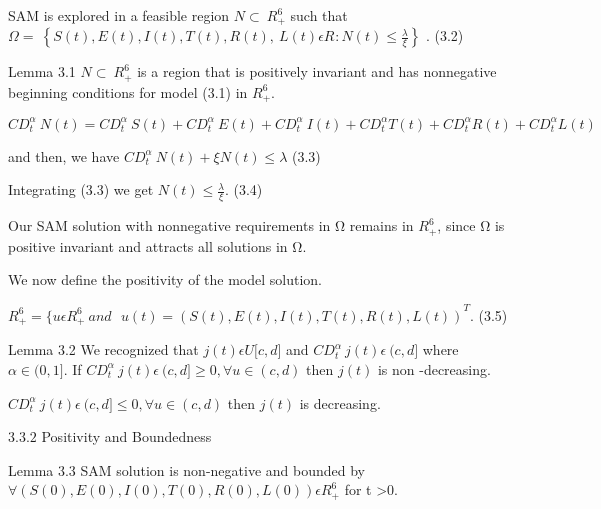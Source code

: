\documentclass[10pt]{NSP1}
\begin{document}
\par\vspace{14.0pt}\vspace{14.0pt}

SAM is explored in a feasible region \(N \subset \ R_{+}^{6}\) such that \(\Omega = \ \left\{ S(t),E(t),I(t),T(t),R(t),\ L(t)\epsilon R^{}:N(t) \leq \frac{\lambda}{\xi} \right\}\) . (3.2)

Lemma 3.1 \(N \subset \ R_{+}^{6}\) is a region that is positively invariant and has nonnegative beginning conditions for model (3.1) in \(R_{+}^{6}.\)

\par\vspace{14.0pt}\vspace{14.0pt}

\[
CD_{t}^{\alpha}\ N(t) = CD_{t}^{\alpha}\ S(t) + CD_{t}^{\alpha}\ E(t) + CD_{t}^{\alpha}\ I(t) + CD_{t}^{\alpha}T(t) + CD_{t}^{\alpha}R(t) + CD_{t}^{\alpha}L(t)
\]

and then, we have \(CD_{t}^{\alpha}\ N(t) + \xi N(t) \leq \lambda\) (3.3)

Integrating (3.3) we get \(N(t) \leq \frac{\lambda}{\xi}\). (3.4)

Our SAM solution with nonnegative requirements in Ω remains in \(R_{+}^{6}\), since Ω is positive invariant and attracts all solutions in Ω.

We now define the positivity of the model solution.

\(R_{+}^{6} = {\{ u\epsilon R_{+}^{6}\ and\ \ \ u(t) = (S(t),E(t),I(t),T(t),R(t),L(t))}^{T}.\) (3.5)

Lemma 3.2 We recognized that \(j(t)\epsilon U\lbrack c,d\rbrack\) and \(CD_{t}^{\alpha}\ j(t)\epsilon\ (c,d\rbrack\) where \(\alpha \in (0,1\rbrack\). If \(CD_{t}^{\alpha}\ j(t)\epsilon\ (c,d\rbrack \geq 0,\forall u \in (c,d)\) then \(j(t)\) is non -decreasing.

\(CD_{t}^{\alpha}\ j(t)\epsilon\ (c,d\rbrack \leq 0,\forall u \in (c,d)\) then \(j(t)\) is decreasing.

3\(.3.2\) Positivity and Boundedness

Lemma 3.3 SAM solution is non-negative and bounded by \(\forall(S(0),E(0),I(0),T(0),R(0),L(0))\epsilon R_{+}^{6}\) for t \textgreater{}0.

\par\vspace{14.0pt}\vspace{14.0pt}
\end{document}
